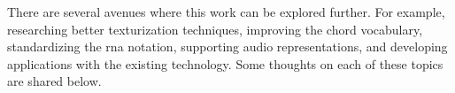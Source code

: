
There are several avenues where this work can be explored
further. For example, researching better texturization
techniques, improving the chord vocabulary, standardizing
the \gls{rna} notation, supporting audio representations,
and developing applications with the existing technology.
Some thoughts on each of these topics are shared below.
